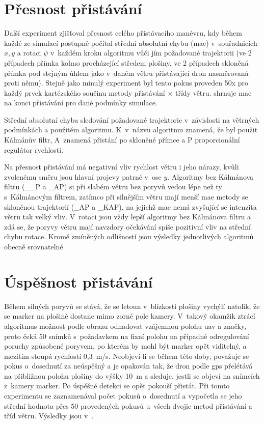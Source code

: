   \section{Přesnost přistávání} \label{sec:presnostPristavani}
    Další experiment zjišťoval přesnost celého přistávacího manévru, kdy během každé ze simulací postupně počítal střední absolutní chybu (\acrshort{mae}) v~souřadnicích $x, y$ a rotaci $\psi$ v~každém kroku algoritmu vůči jím požadované trajektorii (ve 2 případech přímka kolmo procházející středem plošiny, ve 2 případech skloněná přímka pod stejným úhlem jako v~daném větru přistávající dron nasměrovaná proti němu). Stejně jako minulý experiment byl tento pokus proveden 50x pro každý prvek kartézského součinu metody přistávání $\times$ třídy větru.  shrnuje \acrshort{mae} na konci přistávání pro dané podmínky simulace.

    \begin{table}
      \centering
      
      \caption[Střední absolutní chyba přistávání]{Střední absolutní chyba sledování požadované trajektorie v~závislosti na větrných podmínkách a použitém algoritmu. K~v~názvu algoritmu znamená, že byl použit Kálmánův filtr, A~znamená přistání po skloněné přímce a P proporcionální regulátor rychlosti.}
      \label{tab:mae}
    \end{table}

    Na přesnost přistávání má negativní vliv rychlost větru i jeho nárazy, kvůli zvolenému směru jsou hlavní projevy patrné v~ose $y$. Algoritmy bez Kálmánova filtru (\_\_P a \_AP) si při slabém větru bez poryvů vedou lépe než ty s~Kálmánovým filtrem, zatímco při silnějším větru mají menší \acrshort{mae} metody se skloněnou trajektorií (\_AP a \_KAP), na jejichž \acrshort{mae} nemá zvyšující se intenzita větru tak velký vliv. V~rotaci jsou vždy lepší algoritmy bez Kálmánova filtru a zdá se, že poryvy větru mají navzdory očekávání spíše pozitivní vliv na střední chybu rotace. Kromě zmíněných odlišností jsou výsledky jednotlivých algoritmů obecně srovnatelné.
  \section{Úspěšnost přistávání} \label{sec:uspesnost}
    Během silných poryvů se stává, že se letoun v~blízkosti plošiny vychýlí natolik, že se marker na plošině dostane mimo zorné pole kamery. V~takový okamžik ztrácí algoritmus možnost podle obrazu odhadovat vzájemnou polohu \acrshort{uav} a značky, proto čeká 50 snímků s~požadavkem na fixní polohu na případné odregulování poruchy způsobené poryvem, po kterém by mohl být marker opět viditelný, a mezitím stoupá rychlostí 0{,}3~m/s. {Neobjeví-li} se během této doby, považuje se pokus o~dosednutí za neúspěšný a je opakován tak, že dron podle \acrshort{gps} přelétává na přibližnou polohu plošiny do výšky 10~m a sleduje, jestli se objeví na snímcích z~kamery marker. Po úspěšné detekci se opět pokouší přistát. Při tomto experimentu se zaznamenával počet pokusů o~dosednutí a vypočetla se jeho střední hodnota přes 50 provedených pokusů u~všech dvojic metod přistávání a tříd větru. Výsledky jsou v~.


